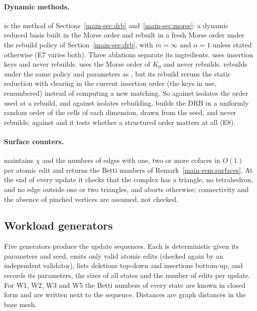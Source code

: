 \paragraph{Dynamic methods.}
 is the method of Sections~\ref{main-sec:drb} and~\ref{main-sec:morse}: a dynamic reduced basis built
in the Morse order and rebuilt in a fresh Morse order under the rebuild policy of
Section~\ref{main-sec:drb}, with $m=\infty$ and $\alpha=1$ unless stated otherwise (E7
varies both). Three ablations separate its ingredients.  uses
insertion keys and never rebuilds.  uses the Morse order of
$K_0$ and never rebuilds.  rebuilds under the same policy and
parameters as , but its rebuild reruns the static reduction with
clearing in the current insertion order (the keys in use, renumbered) instead
of computing a new matching. So  against 
isolates the order used at a rebuild, and  against
 isolates rebuilding.  builds the DRB in a
uniformly random order of the cells of each dimension, drawn from the seed, and
never rebuilds; against  and  it tests whether
a structured order matters at all (E8).

\paragraph{Surface counters.}
 maintains $\chi$ and the numbers of edges with one, two or
more cofaces in $O(1)$ per atomic edit and returns the Betti numbers of
Remark~\ref{main-rem:surfaces}. At the end of every update it checks that the complex has a
triangle, no tetrahedron, and no edge outside one or two triangles, and aborts
otherwise; connectivity and the absence of pinched vertices are assumed, not
checked.


\subsection{Workload generators}\label{sec:exp-workloads}


Five generators produce the update sequences. Each is
deterministic given its parameters and seed, emits only valid atomic edits
(checked again by an independent validator), lists deletions top-down and
insertions bottom-up, and records its parameters, the sizes of all states and
the number of edits per update. For W1, W2, W3 and W5 the Betti numbers of every
state are known in closed form and are written next to the sequence. Distances
are graph distances in the base mesh.

